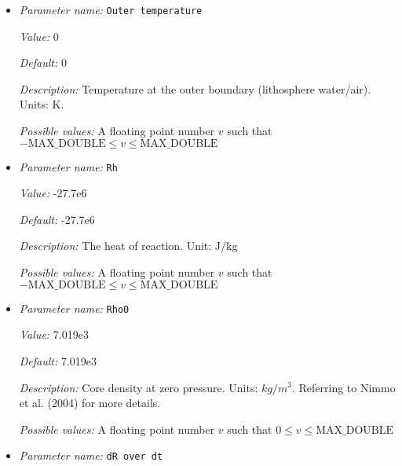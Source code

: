 \begin{itemize}
{\it Value:} 30000


{\it Default:} 30000


{\it Description:} The max iterations for nonliner core energy solver.


{\it Possible values:} An integer $n$ such that $0\leq n \leq 2147483647$
\item {\it Parameter name:} {\tt Outer temperature}
\label{parameters:Boundary temperature model/Dynamic core/Outer temperature}


{\it Value:} 0


{\it Default:} 0


{\it Description:} Temperature at the outer boundary (lithosphere water/air). Units: K.


{\it Possible values:} A floating point number $v$ such that $-\text{MAX\_DOUBLE} \leq v \leq \text{MAX\_DOUBLE}$
\item {\it Parameter name:} {\tt Rh}
\label{parameters:Boundary temperature model/Dynamic core/Rh}


{\it Value:} -27.7e6


{\it Default:} -27.7e6


{\it Description:} The heat of reaction. Unit: J/kg


{\it Possible values:} A floating point number $v$ such that $-\text{MAX\_DOUBLE} \leq v \leq \text{MAX\_DOUBLE}$
\item {\it Parameter name:} {\tt Rho0}
\label{parameters:Boundary temperature model/Dynamic core/Rho0}


{\it Value:} 7.019e3


{\it Default:} 7.019e3


{\it Description:} Core density at zero pressure. Units: $kg/m^3$. Referring to Nimmo et al. (2004) for more details.


{\it Possible values:} A floating point number $v$ such that $0 \leq v \leq \text{MAX\_DOUBLE}$
\item {\it Parameter name:} {\tt dR over dt}
\label{parameters:Boundary temperature model/Dynamic core/dR over dt}



\end{itemize}
